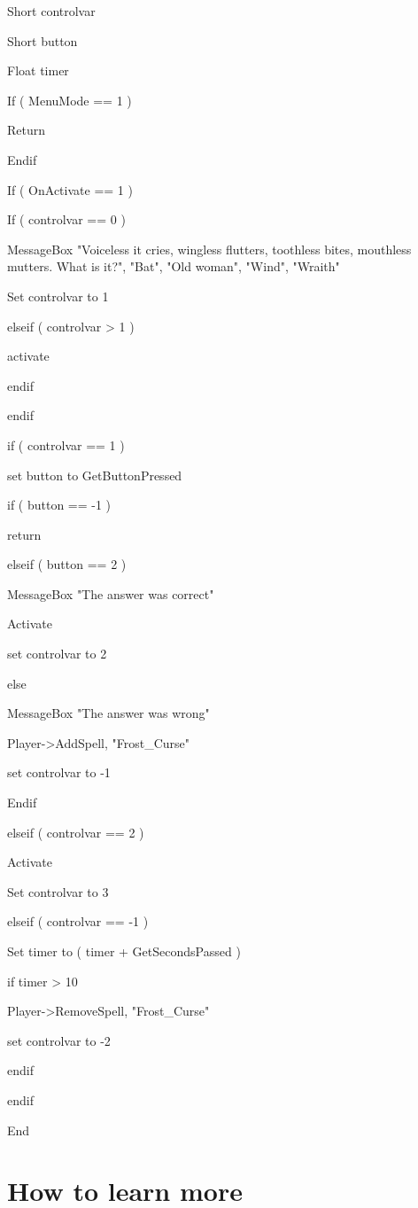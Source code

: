 \documentclass[
]{article}
\begin{document}
Short controlvar

Short button

Float timer

If ( MenuMode == 1 )

Return

Endif

If ( OnActivate == 1 )

If ( controlvar == 0 )

MessageBox "Voiceless it cries, wingless flutters, toothless bites,
mouthless mutters. What is it?", "Bat", "Old woman", "Wind", "Wraith"

Set controlvar to 1

elseif ( controlvar \textgreater{} 1 )

activate

endif

endif

if ( controlvar == 1 )

set button to GetButtonPressed

if ( button == -1 )

return

elseif ( button == 2 )

MessageBox "The answer was correct"

Activate

set controlvar to 2

else

MessageBox "The answer was wrong"

Player-\textgreater AddSpell, "Frost\_Curse"

set controlvar to -1

Endif

elseif ( controlvar == 2 )

Activate

Set controlvar to 3

elseif ( controlvar == -1 )

Set timer to ( timer + GetSecondsPassed )

if timer \textgreater{} 10

Player-\textgreater RemoveSpell, "Frost\_Curse"

set controlvar to -2

endif

endif

End

\hypertarget{how-to-learn-more}{%
\section{How to learn more}\label{how-to-learn-more}}
\end{document}
